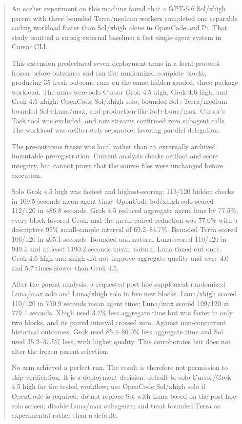 \documentclass[11pt,oneside]{article}
\begin{document}
\begin{abstract}
An earlier experiment on this machine found that a GPT-5.6 Sol/xhigh parent
with three bounded Terra/medium workers completed one separable coding workload
faster than Sol/xhigh alone in OpenCode and Pi. That study omitted a strong
external baseline: a fast single-agent system in Cursor CLI.

This extension predeclared seven deployment arms in a local protocol frozen
before outcomes and ran five randomized complete blocks, producing 35 fresh
outcome runs on the same hidden-graded, three-package workload. The arms were
solo Cursor Grok 4.5 high, Grok 4.6 high,
and Grok 4.6 xhigh; OpenCode Sol/xhigh solo; bounded Sol+Terra/medium; bounded
Sol+Luna/max; and production-like Sol+Luna/max. Cursor's Task tool was excluded,
and raw streams confirmed zero subagent calls. The workload was deliberately
separable, favoring parallel delegation.

The pre-outcome freeze was local rather than an externally archived immutable
preregistration. Current analysis checks artifact and score integrity, but cannot
prove that the source files were unchanged before execution.

Solo Grok 4.5 high was fastest and highest-scoring: 113/120 hidden checks in
109.5 seconds mean agent time. OpenCode Sol/xhigh solo scored 112/120 in 486.8
seconds. Grok 4.5 reduced aggregate agent time by 77.5\%; every block favored
Grok, and the mean paired reduction was 77.0\% with a descriptive 95\%
small-sample interval of 69.2--84.7\%. Bounded Terra scored 106/120 in 405.1
seconds. Bounded and natural Luna scored 110/120 in 949.4 and at least 1190.2
seconds mean; natural Luna timed out once. Grok 4.6 high and xhigh did not
improve aggregate quality and were 4.0 and 5.7 times slower than Grok 4.5.

After the parent analysis, a requested post-hoc supplement randomized Luna/max
solo and Luna/xhigh solo in five new blocks. Luna/xhigh scored 110/120 in 750.9
seconds mean agent time; Luna/max scored 109/120 in 779.4 seconds. Xhigh used
3.7\% less aggregate time but was faster in only two blocks, and its paired
interval crossed zero. Against non-concurrent historical outcomes, Grok used
85.4--86.0\% less aggregate time and Sol used 35.2--37.5\% less, with higher
quality. This corroborates but does not alter the frozen parent selection.

No arm achieved a perfect run. The result is therefore not permission to skip
verification. It is a deployment decision: default to solo Cursor/Grok 4.5 high
for the tested workflow; use OpenCode Sol/xhigh solo if OpenCode is required;
do not replace Sol with Luna based on the post-hoc solo screen; disable Luna/max
subagents; and treat bounded Terra as experimental rather than a default.
\end{abstract}
\end{document}
